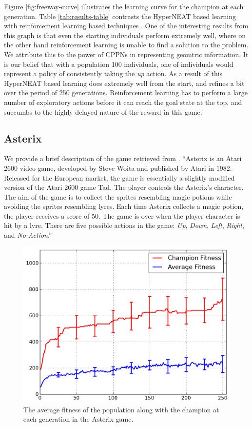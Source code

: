 \documentclass{acm_proc_article-sp}
\begin{document}
Figure \ref{fig:freeway-curve} illustrates the learning curve for the champion at each generation. Table \ref{tab:results-table} contrasts the HyperNEAT based learning with reinforcement learning based techniques \cite{naddaf10}. One of the interesting results from this graph is that even the starting individuals perform extremely well, where on the other hand reinforcement learning is unable to find a solution to the problem. We attribute this to the power of CPPNs in representing geomtric information. It is our belief that with a population 100 individuals, one of individuals would represent a policy of consistently taking the \textit{up} action. As a result of this HyperNEAT based learning does extremely well from the start, and refines a bit over the period of 250 generations. Reinforcement learning has to perform a large number of exploratory actions before it can reach the goal state at the top, and succumbs to the highly delayed nature of the reward in this game.

\subsection {Asterix}
We provide a brief description of the game retrieved from \cite{naddaf10}. ``Asterix is an Atari 2600 video game, developed by Steve Woita and published by Atari in 1982. Released for the European market, the game is essentially a slightly modified version of the Atari 2600 game Tad. The player controls the Asterix’s character. The aim of the game is to collect the sprites resembling magic potions while avoiding the sprites resembling lyres. Each time Asterix collects a magic potion, the player receives a score of 50. The game is over when the player character is hit by a lyre. There are five possible actions in the game: \textit{Up}, \textit{Down}, \textit{Left}, \textit{Right}, and \textit{No-Action}.''

\begin{figure}[ht]
\begin{center}
\includegraphics[width=\columnwidth]{figures/asterix-results.png}
\end{center}
\caption{The average fitness of the population along with the champion at each generation in the Asterix game.}
\label{fig:asterix-curve}
\end{figure}
\end{document}
